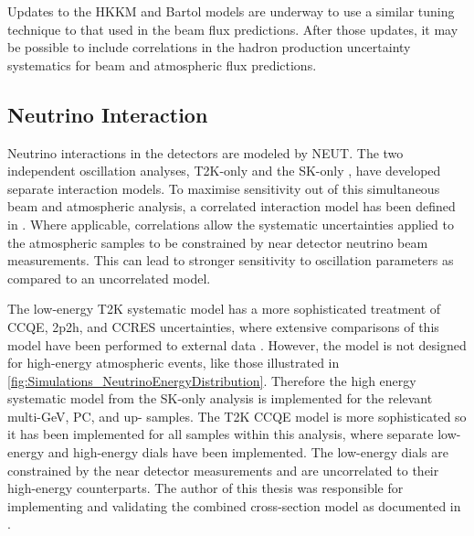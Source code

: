 Updates to the HKKM and Bartol models are underway \cite{Sato2022-ss} to use a similar tuning technique to that used in the beam flux predictions. After those updates, it may be possible to include correlations in the hadron production uncertainty systematics for beam and atmospheric flux predictions.

\subsection{Neutrino Interaction}
\label{sec:SelsAndSysts_Systs_Interaction}

Neutrino interactions in the detectors are modeled by NEUT. The two independent oscillation analyses, T2K-only \cite{t2k_tn_344} and the SK-only \cite{Kamiokande_Collaboration2017-nf}, have developed separate interaction models. To maximise sensitivity out of this simultaneous beam and atmospheric analysis, a correlated interaction model has been defined in \cite{t2k_tn_422}. Where applicable, correlations allow the systematic uncertainties applied to the atmospheric samples to be constrained by near detector neutrino beam measurements. This can lead to stronger sensitivity to oscillation parameters as compared to an uncorrelated model.

The low-energy T2K systematic model has a more sophisticated treatment of CCQE, 2p2h, and CCRES uncertainties, where extensive comparisons of this model have been performed to external data \cite{t2k_tn_344}. However, the model is not designed for high-energy atmospheric events, like those illustrated in \autoref{fig:Simulations_NeutrinoEnergyDistribution}. Therefore the high energy systematic model from the SK-only analysis is implemented for the relevant multi-GeV, PC, and up-\quickmath{\mu} samples. The T2K CCQE model is more sophisticated so it has been implemented for all samples within this analysis, where separate low-energy and high-energy dials have been implemented. The low-energy dials are constrained by the near detector measurements and are uncorrelated to their high-energy counterparts. The author of this thesis was responsible for implementing and validating the combined cross-section model as documented in \cite{t2k_tn_422, t2k_tn_426}.


